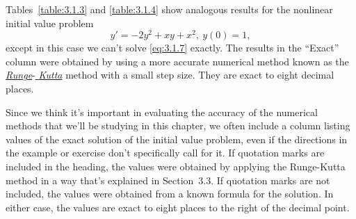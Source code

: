 \begin{example}
  \label{example:3.1.3} \rm Tables~\ref{table:3.1.3} and \ref{table:3.1.4} show analogous results
  for the nonlinear initial value problem
  \begin{equation}
    \label{eq:3.1.7}y'=-2y^{2}+xy+x^{2},\ y(0)=1,
  \end{equation}
  except in this case we can't solve \eqref{eq:3.1.7} exactly. The results in the ``Exact'' column
  were obtained by using a more accurate numerical method known as the
  \href{https://mathshistory.st-andrews.ac.uk/Biographies/Runge/}{\color{blue}
  \it Runge}-\href{https://mathshistory.st-andrews.ac.uk/Biographies/Kutta/}{\it
  \color{blue}
  Kutta\/} method with a small step size. They are exact to eight decimal places.\bbox
\end{example}

Since we think it's important in evaluating the accuracy of the numerical methods that we'll be
studying in this chapter, we often include a column listing values of the exact solution of the
initial value problem, even if the directions in the example or exercise don't specifically call for
it. If quotation marks are included in the heading, the values were obtained by applying the
Runge-Kutta method in a way that's explained in Section~3.3. If quotation marks are not included,
the values were obtained from a known formula for the solution. In either case, the values are exact
to eight places to the right of the decimal point.

